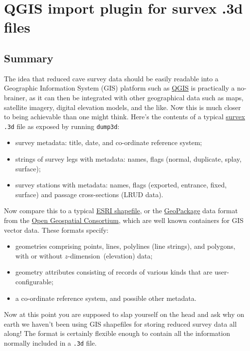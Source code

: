 \documentclass[]{article}
\date{}
\providecommand{\tightlist}{%
  \setlength{\itemsep}{0pt}\setlength{\parskip}{0pt}}
\newcommand{\zdimension}{$z$-dimension}
\begin{document}
\section{QGIS import plugin for survex .3d files}

\subsection{Summary}\label{summary}

The idea that reduced cave survey data should be easily readable into a
Geographic Information System (GIS) platform such as
\href{http://www.qgis.org/}{QGIS} is practically a no-brainer, as it can
then be integrated with other geographical data such as maps, satellite
imagery, digital elevation models, and the like. Now this is much closer
to being achievable than one might think. Here's the contents of a
typical \href{https://survex.com/}{survex} \verb}.3d} file as exposed
by running \verb}dump3d}:

\begin{itemize}
\tightlist
\item
  survey metadata: title, date, and co-ordinate reference system;
\item
  strings of survey legs with metadata: names, flags (normal, duplicate,
  splay, surface);
\item
  survey stations with metadata: names, flags (exported, entrance,
  fixed, surface) and passage cross-sections (LRUD data).
\end{itemize}

Now compare this to a typical
\href{https://en.wikipedia.org/wiki/Shapefile}{ESRI shapefile}, or the
\href{https://en.wikipedia.org/wiki/GeoPackage}{GeoPackage} data format
from the
\href{https://en.wikipedia.org/wiki/Open_Geospatial_Consortium}{Open
Geospatial Consortium}, which are well known containers for GIS vector
data. These formats specify:

\begin{itemize}
\tightlist
\item
  geometries comprising points, lines, polylines (line strings), and
  polygons, with or without \zdimension\ (elevation) data;
\item
  geometry attributes consisting of records of various kinds that are
  user-configurable;
\item
  a co-ordinate reference system, and possible other metadata.
\end{itemize}

Now at this point you are supposed to slap yourself on the head and ask
why on earth we haven't been using GIS shapefiles for storing reduced
survey data all along! The format is certainly flexible enough to
contain all the information normally included in a \verb}.3d} file.
\end{document}
